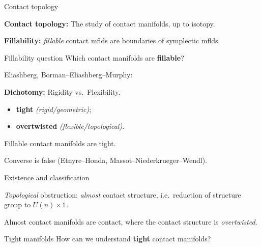 \documentclass{beamer}
\begin{document}
\begin{frame}{Contact topology}

\textbf{Contact topology:} The study of contact manifolds, up to isotopy.

\medskip

\pause

\textbf{Fillability:} \emph{fillable} contact mflds are boundaries of symplectic mflds.

\pause

\begin{exampleblock}{Fillability question}  Which contact manifolds are \textbf{fillable}?
\end{exampleblock}

\pause

Eliashberg, Borman--Eliashberg--Murphy:

\begin{tcolorbox}
\textbf{Dichotomy:} Rigidity vs.\ Flexibility. 
\begin{itemize}
    \item \textbf{tight} \emph{(rigid/geometric)};
    \item  \textbf{overtwisted} \emph{(flexible/topological)}. 
\end{itemize}
\end{tcolorbox} 

\pause

\begin{theorem}
Fillable contact manifolds are tight.
\end{theorem}

Converse is false (Etnyre--Honda, Massot--Niederkrueger--Wendl).

\end{frame}

\begin{frame}{Existence and classification}

\emph{Topological} obstruction: \emph{almost} contact structure, i.e.\ reduction of structure group to $U(n)\times \mathds 1$.

\begin{theorem}

Almost contact manifolds are contact, where the contact structure is \emph{overtwisted}.

\end{theorem}

\pause

\begin{exampleblock}{Tight manifolds}
How can we understand \textbf{tight} contact manifolds?
\end{exampleblock}
    
\end{frame}
\end{document}

